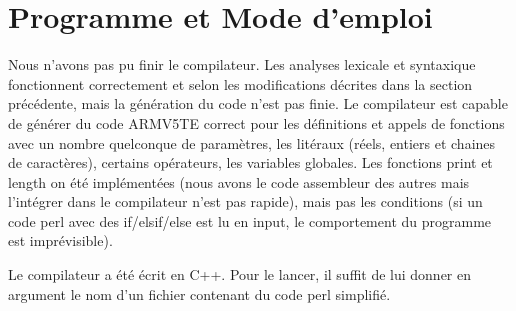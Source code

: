 \documentclass[a4paper,10pt]{article}
\begin{document}
\section{Programme et Mode d'emploi}

	Nous n'avons pas pu finir le compilateur. Les analyses lexicale et syntaxique
	fonctionnent correctement et selon les modifications décrites dans la section
	précédente, mais la génération du code n'est pas finie. Le compilateur est
	capable de générer du code ARMV5TE correct pour les définitions et appels de
	fonctions avec un nombre quelconque de paramètres, les litéraux (réels, entiers
	et chaines de caractères), certains opérateurs, les variables globales. Les
	fonctions print et length on été implémentées (nous avons le code assembleur
	des autres mais l'intégrer dans le compilateur n'est pas rapide), mais pas les
	conditions (si un code perl avec des if/elsif/else est lu en input, le comportement du programme est imprévisible).
	
	Le compilateur a été écrit en C++. Pour le lancer, il suffit de lui donner en
	argument le nom d'un fichier contenant du code perl simplifié.
	
\end{document}
